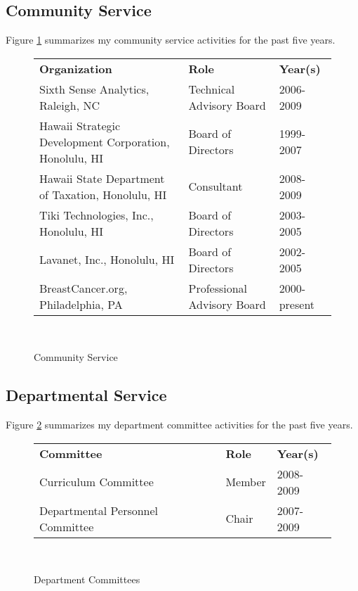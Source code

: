 \documentclass[11pt]{article}
\begin{document}
\subsection{Community Service}

Figure \ref{fig:community-service} summarizes my community service activities for the past five years. 


\begin{figure}[!ht]
\small
\begin{tabular}{p{3.5in}ll} \hline
{\bf Organization} & {\bf Role} & {\bf Year(s)}  \\
Sixth Sense Analytics, Raleigh, NC & Technical Advisory
Board & 2006-2009 \\

Hawaii Strategic Development Corporation, Honolulu, HI &  Board of
Directors &  1999-2007  \\

Hawaii State Department of Taxation, Honolulu, HI & Consultant &  2008-2009 \\

Tiki Technologies, Inc., Honolulu, HI & Board of Directors &
2003-2005  \\

Lavanet, Inc., Honolulu, HI & Board of Directors  & 2002-2005 \\

BreastCancer.org, Philadelphia, PA & Professional Advisory Board &
2000-present  \\ \hline

\end{tabular} \\ 
\normalsize
\caption{Community Service}
\label{fig:community-service}
\end{figure}

\newpage
\subsection{Departmental Service}

Figure \ref{fig:department-service} summarizes my department committee activities for the past five years. 


\begin{figure}[!ht]
\small
\begin{tabular}{p{4in}ll} \hline
{\bf Committee} & {\bf Role} & {\bf Year(s)}  \\
Curriculum Committee & Member & 2008-2009 \\
Departmental Personnel Committee & Chair &  2007-2009 \\ \hline
\end{tabular} \\ 
\normalsize
\caption{Department Committees}
\label{fig:department-service}
\end{figure}
\end{document}
